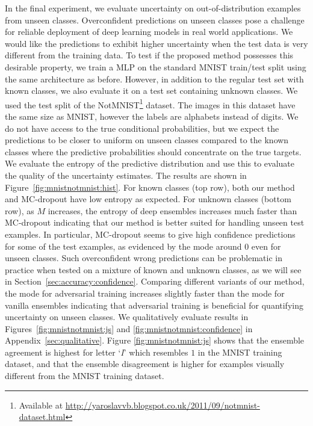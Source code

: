 \documentclass{article}
\begin{document}
{In the final experiment, we evaluate uncertainty on out-of-distribution examples from unseen classes. Overconfident predictions on unseen classes pose a challenge for reliable deployment of deep learning models in real world applications. We would like the predictions to exhibit higher uncertainty when the test data is very different from the training data. To test if the proposed method possesses this desirable property,  we train a MLP on the standard MNIST train/test split using the same architecture as before. However, in addition to the regular test set with known classes, we also evaluate it on a test set containing unknown classes. We used the test split of the NotMNIST\footnote{Available at \url{http://yaroslavvb.blogspot.co.uk/2011/09/notmnist-dataset.html}} dataset. The images in this dataset have the same size as MNIST, however the labels are alphabets instead of digits. 
We do not have access to the true conditional probabilities, but we expect the predictions to be closer to uniform on unseen classes compared to the known classes where the predictive probabilities should concentrate on the true targets. 
We evaluate the entropy of the predictive distribution and use this  to evaluate the quality of the uncertainty estimates. 
The results are shown in Figure~\ref{fig:mnistnotmnist:hist}. %
 For known classes (top row), both our method and MC-dropout have low entropy  as expected. %
    For unknown classes (bottom row), as $M$ increases, the entropy of deep ensembles increases much faster than MC-dropout indicating that our method is better suited for handling unseen test examples. In particular, MC-dropout seems to give high confidence predictions for some of the test examples, as evidenced by the mode around 0 even for unseen classes. Such overconfident wrong predictions can be problematic in practice when tested on a mixture of known and unknown classes, as we will see in Section~\ref{sec:accuracy:confidence}. %
Comparing different variants of our method, the mode for adversarial training increases slightly faster than the mode for vanilla ensembles indicating that adversarial training is beneficial for quantifying uncertainty on  unseen classes. 
We  qualitatively evaluate results in Figures~\ref{fig:mnistnotmnist:js} and \ref{fig:mnistnotmnist:confidence} in Appendix~\ref{sec:qualitative}. Figure \ref{fig:mnistnotmnist:js} shows that the ensemble agreement is highest for letter `\emph{I}' which resembles $1$ in the MNIST training dataset, and that the ensemble disagreement is higher for examples visually different from the MNIST training dataset. 


}
\end{document}
